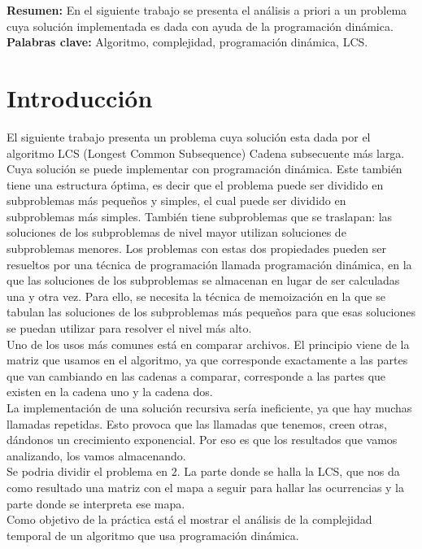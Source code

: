 \documentclass{article}
\begin{document}
    \textbf{Resumen: }
    En el siguiente trabajo se presenta el análisis a priori a un problema cuya solución implementada es dada con ayuda de la programación dinámica. \\
     
    \textbf{Palabras clave: } Algoritmo, complejidad, programación dinámica, LCS.
\section{Introducción}
    El siguiente trabajo presenta un problema cuya solución esta dada por el algoritmo LCS (Longest Common Subsequence) Cadena subsecuente más larga. Cuya solución se puede implementar con programación dinámica. Este también tiene una estructura óptima, es decir que el problema puede ser dividido en subproblemas más pequeños y simples, el cual puede ser dividido en subproblemas más simples. También tiene subproblemas que se traslapan: las soluciones de los subproblemas de nivel mayor utilizan soluciones de subproblemas menores. Los problemas con estas dos propiedades pueden ser resueltos por una técnica de programación llamada programación dinámica, en la que las soluciones de los subproblemas se almacenan en lugar de ser calculadas una y otra vez. Para ello, se necesita la técnica de memoización en la que se tabulan las soluciones de los subproblemas más pequeños para que esas soluciones se puedan utilizar para resolver el nivel más alto. \\
    Uno de los usos más comunes está en comparar archivos. El principio viene de la matriz que usamos en el algoritmo, ya que corresponde exactamente a las partes que van cambiando en las cadenas a comparar, corresponde a las partes que existen en la cadena uno y la cadena dos. \\
    La implementación de una solución recursiva sería ineficiente, ya que hay muchas llamadas repetidas. Esto provoca que las llamadas que tenemos, creen otras, dándonos un crecimiento exponencial. Por eso es que los resultados que vamos analizando, los vamos almacenando.\\ Se podria dividir el problema en 2. La parte donde se halla la LCS, que nos da como resultado una matriz con el mapa a seguir para hallar las ocurrencias y la parte donde se interpreta ese mapa.\\
    Como objetivo de la práctica está el mostrar el análisis de la complejidad temporal de un algoritmo que usa programación dinámica.\cite{1}
\end{document}
